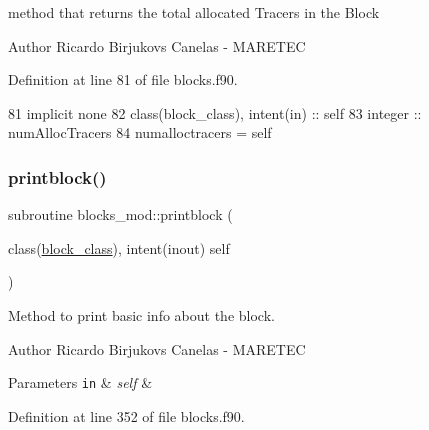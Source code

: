method that returns the total allocated Tracers in the Block 

\begin{DoxyAuthor}{Author}
Ricardo Birjukovs Canelas -\/ M\+A\+R\+E\+T\+EC 
\end{DoxyAuthor}


Definition at line 81 of file blocks.\+f90.


\begin{DoxyCode}
81     \textcolor{keywordtype}{implicit none}
82     \textcolor{keywordtype}{class}(block\_class), \textcolor{keywordtype}{intent(in)} :: self
83     \textcolor{keywordtype}{integer} :: numAllocTracers
84     numalloctracers = self%
\end{DoxyCode}
\mbox{\label{namespaceblocks__mod_a6eab8b323cb15dcecb5c6b0c31b4e246}} 
\subsubsection{\texorpdfstring{printblock()}{printblock()}}
{\footnotesize\ttfamily subroutine blocks\+\_\+mod\+::printblock (\begin{DoxyParamCaption}\item[{class(\mbox{\hyperlink{structblocks__mod_1_1block__class}{block\+\_\+class}}), intent(inout)}]{self }\end{DoxyParamCaption})\hspace{0.3cm}{\ttfamily [private]}}



Method to print basic info about the block. 

\begin{DoxyAuthor}{Author}
Ricardo Birjukovs Canelas -\/ M\+A\+R\+E\+T\+EC 
\end{DoxyAuthor}

\begin{DoxyParams}[1]{Parameters}
\mbox{\tt in}  & {\em self} & \\
\hline
\end{DoxyParams}


Definition at line 352 of file blocks.\+f90.


